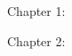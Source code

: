 \documentclass[12pt]{report}
\begin{document}
\newpage


\tableofcontents
\listoftables %
\listoffigures

\newpage

Chapter 1: 


\newpage

Chapter 2:


%

%



\appendix
%
\end{document}
